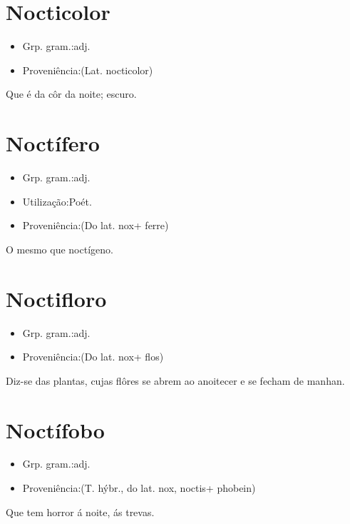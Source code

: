 \section{Nocticolor}
\begin{itemize}
\item {Grp. gram.:adj.}
\end{itemize}
\begin{itemize}
\item {Proveniência:(Lat. \textunderscore nocticolor\textunderscore )}
\end{itemize}
Que é da côr da noite; escuro.
\section{Noctífero}
\begin{itemize}
\item {Grp. gram.:adj.}
\end{itemize}
\begin{itemize}
\item {Utilização:Poét.}
\end{itemize}
\begin{itemize}
\item {Proveniência:(Do lat. \textunderscore nox\textunderscore  + \textunderscore ferre\textunderscore )}
\end{itemize}
O mesmo que \textunderscore noctígeno\textunderscore .
\section{Noctifloro}
\begin{itemize}
\item {Grp. gram.:adj.}
\end{itemize}
\begin{itemize}
\item {Proveniência:(Do lat. \textunderscore nox\textunderscore  + \textunderscore flos\textunderscore )}
\end{itemize}
Diz-se das plantas, cujas flôres se abrem ao anoitecer e se fecham de manhan.
\section{Noctífobo}
\begin{itemize}
\item {Grp. gram.:adj.}
\end{itemize}
\begin{itemize}
\item {Proveniência:(T. hýbr., do lat. \textunderscore nox\textunderscore , \textunderscore noctis\textunderscore  + \textunderscore phobein\textunderscore )}
\end{itemize}
Que tem horror á noite, ás trevas.
